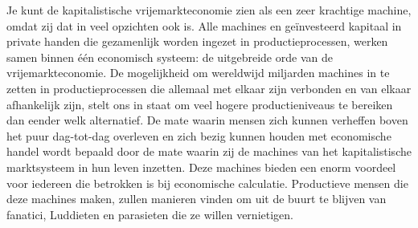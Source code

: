 Je kunt de kapitalistische vrijemarkteconomie zien als een zeer krachtige machine, omdat zij dat in veel opzichten ook is. Alle machines en geïnvesteerd kapitaal in private handen die gezamenlijk worden ingezet in productieprocessen, werken samen binnen één economisch systeem: de uitgebreide orde van de vrijemarkteconomie. De mogelijkheid om wereldwijd miljarden machines in te zetten in productieprocessen die allemaal met elkaar zijn verbonden en van elkaar afhankelijk zijn, stelt ons in staat om veel hogere productieniveaus te bereiken dan eender welk alternatief. De mate waarin mensen zich kunnen verheffen boven het puur dag-tot-dag  overleven en zich bezig kunnen houden met economische handel wordt bepaald door de mate waarin zij de machines van het kapitalistische marktsysteem in hun leven inzetten. Deze machines bieden een enorm voordeel voor iedereen die betrokken is bij economische calculatie. Productieve mensen die deze machines maken, zullen manieren vinden om uit de buurt te blijven van fanatici, Luddieten en parasieten die ze willen vernietigen.

